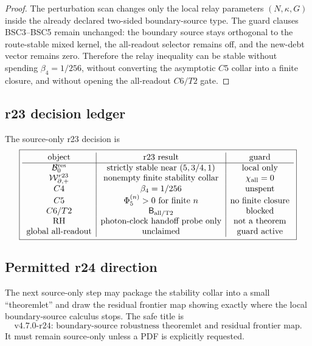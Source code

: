 \begin{proof}
The perturbation scan changes only the local relay parameters \((N,\kappa,G)\)
inside the already declared two-sided boundary-source type.  The guard clauses
BSC3--BSC5 remain unchanged: the boundary source stays orthogonal to the
route-stable mixed kernel, the all-readout selector remains off, and the new-debt
vector remains zero.  Therefore the relay inequality can be stable without
spending \(\beta_4=1/256\), without converting the asymptotic \(C5\) collar into a
finite closure, and without opening the all-readout \(C6/T2\) gate.
\end{proof}

\subsection{r23 decision ledger}
\label{subsec:v470-r23-decision-ledger}

The source-only r23 decision is
\[
\boxed{
\begin{array}{c|c|c}
\text{object} & \text{r23 result} & \text{guard}\\
\hline
\mathcal B_0^{\rm res} & \text{strictly stable near }(5,3/4,1) & \text{local only}\\
\mathcal W_{\partial,+}^{r23} & \text{nonempty finite stability collar} & \chi_{\rm all}=0\\
C4 & \beta_4=1/256 & \text{unspent}\\
C5 & \Phi_5^{(n)}>0\text{ for finite }n & \text{no finite closure}\\
C6/T2 & \mathsf B_{\rm all/T2} & \text{blocked}\\
\text{RH} & \text{photon-clock handoff probe only} & \text{not a theorem}\\
\text{global all-readout} & \text{unclaimed} & \text{guard active}
\end{array}
}
\]

\subsection{Permitted r24 direction}
\label{subsec:v470-r23-permitted-r24-direction}

The next source-only step may package the stability collar into a small
``theoremlet'' and draw the residual frontier map showing exactly where the local
boundary-source calculus stops.  The safe title is
\[
\boxed{
\text{v4.7.0-r24: boundary-source robustness theoremlet and residual frontier map.}
}
\]
It must remain source-only unless a PDF is explicitly requested.




